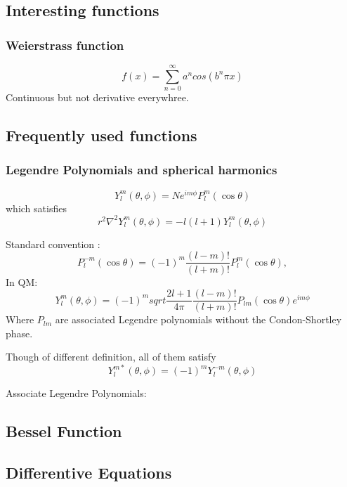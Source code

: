 \subsection{Interesting functions}
\subsubsection{Weierstrass function}
\begin{equation}
    f(x) = \sum_{n=0}^{\infty}a^{n}cos(b^{n}\pi x)
\end{equation}
Continuous but not derivative everywhree.


\subsection{Frequently used functions}

\subsubsection{Legendre Polynomials and spherical harmonics}
\begin{equation}
    Y^m_l(\theta,\phi)=Ne^{im\phi}P^m_l(\cos\theta)
\end{equation}
which satisfies
\[
    r^2\nabla^2Y^m_l(\theta,\phi)=-l(l+1)Y^m_l(\theta,\phi)
    \]

Standard convention :
\[
    P^{-m}_l(\cos\theta)=(-1)^m\frac{(l-m)!}{(l+m)!}P^m_l(\cos\theta),
\]
In QM:
\[
    Y^m_l(\theta,\phi)=(-1)^msqrt{\frac{2l+1}{4\pi}\frac{(l-m)!}{(l+m)!}}P_{lm}(\cos\theta)e^{im\phi}
\]
Where $P_{lm}$ are associated Legendre polynomials without the
Condon-Shortley phase.

Though of different definition, all of them satisfy
\[ 
    Y_l^{m*}(\theta,\phi)=(-1)^{m}Y_{l}^{-m}(\theta,\phi) 
    \]


Associate Legendre Polynomials:

\subsection{Bessel Function}
\subsection{Differentive Equations}

